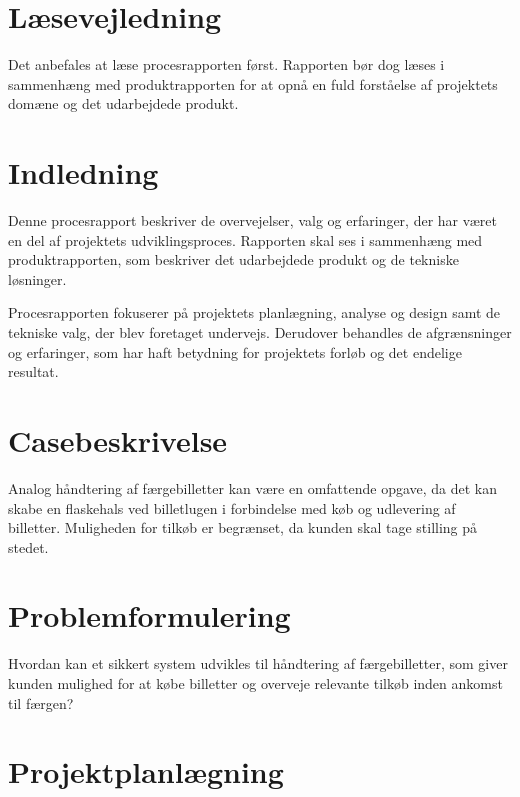 \documentclass[a4paper, 11pt]{article}
\begin{document}


\newpage
\tableofcontents

\newpage

\section{Læsevejledning}

Det anbefales at læse procesrapporten først. Rapporten bør dog læses i sammenhæng med
produktrapporten for at opnå en fuld forståelse af projektets domæne og det udarbejdede
produkt.

\section{Indledning}

Denne procesrapport beskriver de overvejelser, valg og erfaringer, der har været en del af
projektets udviklingsproces. Rapporten skal ses i sammenhæng med produktrapporten, som
beskriver det udarbejdede produkt og de tekniske løsninger.

Procesrapporten fokuserer på projektets planlægning, analyse og design samt de tekniske
valg, der blev foretaget undervejs. Derudover behandles de afgrænsninger og erfaringer, som
har haft betydning for projektets forløb og det endelige resultat.

\section{Casebeskrivelse}

Analog håndtering af færgebilletter kan være en omfattende opgave, da det kan skabe en flaskehals
ved billetlugen i forbindelse med køb og udlevering af billetter. Muligheden for tilkøb er
begrænset, da kunden skal tage stilling på stedet.

\section{Problemformulering}

Hvordan kan et sikkert system udvikles til håndtering af færgebilletter, som giver kunden
mulighed for at købe billetter og overveje relevante tilkøb inden ankomst til færgen?

\section{Projektplanlægning}
\label{sec:projektplanlægning}
\end{document}
